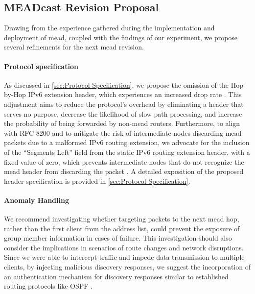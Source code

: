 \subsection{MEADcast Revision Proposal} %
\label{sub:MEADcast Revision Proposal}
Drawing from the experience gathered during the implementation and deployment
    of \gls{mead}, coupled with the findings of our experiment, we
    propose several refinements for the next \gls{mead} revision.

\paragraph{Protocol specification}
As discussed in \autoref{sec:Protocol Specification}, we propose the omission
    of the Hop-by-Hop IPv6 extension header, which experiences an increased
    drop rate \cite{rfc7872_ext_hdrs_drop_rate}.
This adjustment aims to reduce the protocol's overhead by eliminating a header
    that serves no purpose, decrease the likelihood of slow path processing,
    and increase the probability of being forwarded by non-\gls{mead} routers.
Furthermore, to align with RFC 8200 \cite{rfc8200_ipv6_hdr} and to mitigate the
    risk of intermediate nodes discarding \gls{mead} packets due to a malformed
    IPv6 routing extension, we advocate for the inclusion of the ``Segments
    Left'' field from the static IPv6 routing extension header, with a fixed
    value of zero, which prevents intermediate nodes that do not recognize
    the \gls{mead} header from discarding the packet \cite{rfc8200_ipv6_hdr}.
A detailed exposition of the proposed header specification is provided in
    \autoref{sec:Protocol Specification}.

\paragraph{Anomaly Handling} %
We recommend investigating whether targeting packets to the next \gls{mead}
    hop, rather than the first client from the address list, could prevent the
    exposure of group member information in cases of failure.
This investigation should also consider the implications in scenarios of route
    changes and network disruptions.
Since we were able to intercept traffic and impede data transmission to
    multiple clients, by injecting malicious discovery responses, we suggest
    the incorporation of an authentication mechanism for discovery responses
    similar to established routing protocols like OSPF \cite{rfc2328_ospf}.


